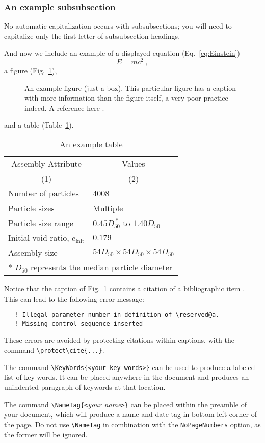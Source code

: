 \documentclass[Proceedings]{ascelike}
\begin{document}
\subsubsection{An example subsubsection}
No automatic capitalization occurs with subsubsections; 
you will need to capitalize only the first letter of subsubsection 
headings.
\par
And now we include an example of a displayed equation (Eq.~\ref{eq:Einstein})
%
\begin{equation} \label{eq:Einstein}
E = m c^{2} \;,
\end{equation}
%
a figure (Fig.~\ref{fig:box_fig}),%
%
\begin{figure}
\centering
\framebox[3.00in]{\rule[0in]{0in}{1.00in}}
\caption{An example figure (just a box).  
This particular figure has a caption with more information 
than the figure itself, a very poor practice indeed.
A reference here \protect\cite{Stahl:2004a}.}
\label{fig:box_fig}
\end{figure}
%
and a table (Table~\ref{table:assembly}).%
%
\begin{table}
\caption{An example table}
\label{table:assembly}
\centering
\small
\renewcommand{\arraystretch}{1.25}
\begin{tabular}{l l}
\hline\hline
\multicolumn{1}{c}{Assembly Attribute} &
\multicolumn{1}{c}{Values} \\
\multicolumn{1}{c}{(1)} &
\multicolumn{1}{c}{(2)} \\
\hline
Number of particles & 4008 \\
Particle sizes & Multiple  \\
Particle size range & $0.45D_{50}^{\:\ast}$ to $1.40D_{50}$ \\
Initial void ratio, $e_{\mathrm{init}}$ & $0.179$ \\
Assembly size & $54D_{50} \times 54D_{50} \times 54D_{50}$ \\
\hline
\multicolumn{2}{l}{$\ast$ $D_{50}$ represents the median particle diameter} \\
\hline\hline
\end{tabular}
\normalsize
\end{table}
%
Notice that the caption of Fig.~\ref{fig:box_fig} contains
a citation of a bibliographic item \cite{Stahl:2004a}.
This can lead to the following error message:
\begin{verbatim}
   ! Illegal parameter number in definition of \reserved@a.
   ! Missing control sequence inserted
\end{verbatim}
These errors are avoided by protecting citations within captions,
with the command \verb|\protect\cite{...}|.
%
\par
The command \verb+\KeyWords{<your key words>}+ can be used to produce
a labeled list of key words.  
It can be placed anywhere in the document and produces an unindented
paragraph of keywords at that location.
\par
The command \verb+\NameTag{<+\emph{your name}\verb+>}+ can be placed
within the preamble of your document, which will produce a name
and date tag in bottom left corner of the page.
Do not use \verb+\NameTag+ in combination with the \verb+NoPageNumbers+
option, as the former will be ignored.
%
\end{document}
